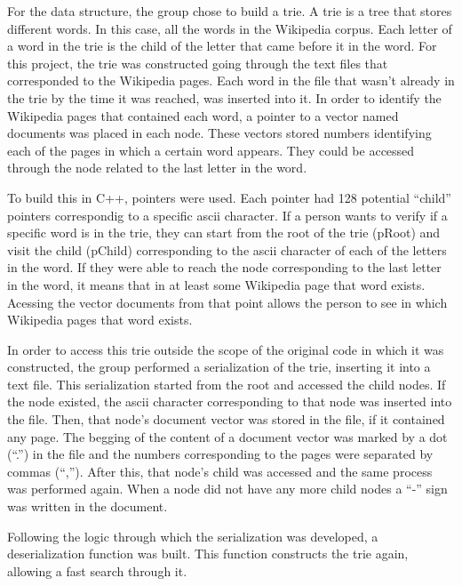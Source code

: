 \documentclass{article}
\begin{document}
For the data structure, the group chose to build a trie. A trie is a tree that stores different words. In this case, all the words in the Wikipedia corpus. Each letter of a word in the trie is the child of the letter that came before it in the word. 
For this project, the trie was constructed going through the text files that corresponded to the Wikipedia pages. Each word in the file that wasn't already in the trie by the time it was reached, was inserted into it. In order to identify the Wikipedia pages that contained each word, a pointer to a vector named documents was placed in each node. These vectors stored numbers identifying each of the pages in which a certain word appears. They could be accessed through the node related to the last letter in the word. 

To build this in C++, pointers were used. Each pointer had 128 potential ``child'' pointers correspondig to a specific ascii character. If a person wants to verify if a specific word is in the trie, they can start from the root of the trie (pRoot) and visit the child (pChild) corresponding to the ascii character of each of the letters in the word. If they were able to reach the node corresponding to the last letter in the word, it means that in at least some Wikipedia page that word exists. Acessing the vector documents from that point allows the person to see in which Wikipedia pages that word exists.


In order to access this trie outside the scope of the original code in which it was constructed, the group performed a serialization of the trie, inserting it into a text file. This serialization started from the root and accessed the child nodes. If the node existed, the ascii character corresponding to that node was inserted into the file. Then, that node's  document vector was stored in the file, if it contained any page. The begging of the content of a document vector was marked by a dot (``.'') in the file and the numbers corresponding to the pages were separated by commas (``,''). After this, that node's child was accessed and the same process was performed again. When a node did not have any more child nodes a ``-'' sign was written in the document. 

Following the logic through which the serialization was developed, a deserialization function was built. This function constructs the trie again, allowing a fast search through it. 
\end{document}

